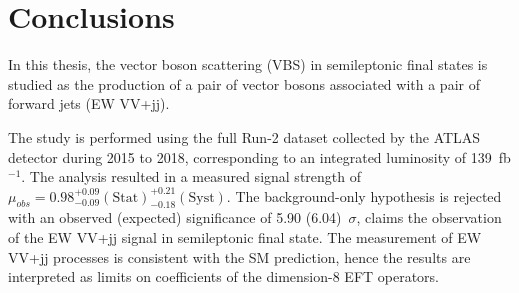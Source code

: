 \chapter{Conclusions}
\label{chap:conclusions}

In this thesis, the vector boson scattering (VBS) in semileptonic final states is studied as the production of a pair of vector bosons associated with a pair of forward jets (EW VV+jj). 

The study is performed using the full Run-2 dataset collected by the ATLAS detector during 2015 to 2018, corresponding to an integrated luminosity of 139~fb$^{-1}$.
The analysis resulted in a measured signal strength of $\mu_{obs} = 0.98^{+ 0.09}_{- 0.09}(\mathrm{Stat})^{+ 0.21}_{- 0.18}(\mathrm{Syst})$.
The background-only hypothesis is rejected with an observed (expected) significance of 5.90 (6.04)~$\sigma$, claims the observation of the EW VV+jj signal in semileptonic final state. 
The measurement of EW VV+jj processes is consistent with the SM prediction, hence the results are interpreted as limits on coefficients of the dimension-8 EFT operators.




